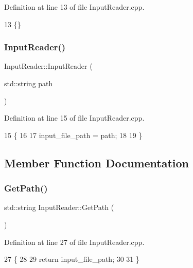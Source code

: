Definition at line 13 of file Input\+Reader.\+cpp.


\begin{DoxyCode}
13 \{\}
\end{DoxyCode}
\mbox{\label{classInputReader_a213700cd8c4b1ed213bf778b7e43b891}} 
\subsubsection{\texorpdfstring{Input\+Reader()}{InputReader()}\hspace{0.1cm}{\footnotesize\ttfamily [2/2]}}
{\footnotesize\ttfamily Input\+Reader\+::\+Input\+Reader (\begin{DoxyParamCaption}\item[{std\+::string}]{path }\end{DoxyParamCaption})}



Definition at line 15 of file Input\+Reader.\+cpp.


\begin{DoxyCode}
15                                        \{
16   
17   input\_file\_path = path;
18   
19 \}
\end{DoxyCode}


\subsection{Member Function Documentation}
\mbox{\label{classInputReader_a159a88dc2d5dbf63923c137636ed2941}} 
\subsubsection{\texorpdfstring{Get\+Path()}{GetPath()}}
{\footnotesize\ttfamily std\+::string Input\+Reader\+::\+Get\+Path (\begin{DoxyParamCaption}{ }\end{DoxyParamCaption})}



Definition at line 27 of file Input\+Reader.\+cpp.


\begin{DoxyCode}
27                                \{
28   
29   \textcolor{keywordflow}{return} input\_file\_path;
30   
31 \}
\end{DoxyCode}
\mbox{\label{classInputReader_ad16dc3ebc228f45257b9ad4c3f62ed14}} 
